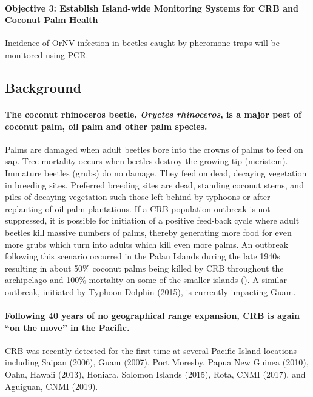 \documentclass[12pt,letterpaper,english,bibliography=totocnumbered, abstract=on]{scrartcl}
\begin{document}
\paragraph{Objective 3:  Establish Island-wide Monitoring Systems for CRB and Coconut Palm Health}
Incidence of OrNV infection in beetles caught by pheromone traps will be monitored using PCR. 

\subsection{Background}

\paragraph{The coconut rhinoceros beetle, \emph{Oryctes rhinoceros}, is a major
pest of coconut palm, oil palm and other palm species.}

Palms are damaged when adult beetles bore into the crowns of palms
to feed on sap. Tree mortality occurs when beetles destroy the growing
tip (meristem). Immature beetles (grubs) do no damage. They feed on
dead, decaying vegetation in breeding sites. Preferred breeding sites
are dead, standing coconut stems, and piles of decaying vegetation
such those left behind by typhoons or after replanting of oil palm
plantations. If a CRB population outbreak is not suppressed, it is possible
for initiation of a positive feed-back cycle where adult beetles kill
massive numbers of palms, thereby generating more food for even more
grubs which turn into adults which kill even more palms. An outbreak
following this scenario occurred in the Palau Islands during the late
1940s resulting in about 50\% coconut palms being killed by CRB throughout
the archipelago and 100\% mortality on some of the smaller islands
(\cite{gressitt_coconut_1953}). A similar outbreak, initiated by Typhoon Dolphin (2015), is currently impacting Guam.

\paragraph{Following 40 years of no geographical range expansion, CRB is again
``on the move'' in the Pacific.}

CRB was recently detected for the first time at several Pacific Island
locations including Saipan (2006), Guam (2007), Port Moresby, Papua
New Guinea (2010), Oahu, Hawaii (2013), Honiara, Solomon Islands
(2015), Rota, CNMI (2017), and Aguiguan, CNMI (2019). 
\end{document}
